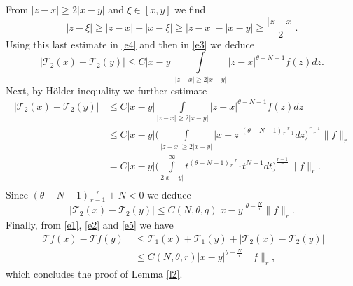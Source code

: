 \documentclass[leqno,12pt]{article}
\newcommand{\intl}{\int\limits}
\numberwithin{equation}{section}
\begin{document}
From $|z-x|\geq 2|x-y|$ and $\xi \in [x,y]$ we find
$$
|z-\xi|\geq |z-x|-|x-\xi|\geq |z-x|-|x-y| \geq \frac{|z-x|}{2}.
$$
Using this last estimate in \eqref{e4} and then in \eqref{e3} we deduce
$$
|\mathcal{T}_2(x)-\mathcal{T}_2(y)|\leq C |x-y| \intl_{|z-x|\geq 2|x-y|} \big|z-x\big|^{\theta-N-1}f(z) dz.
$$
Next, by H\"older inequality we further estimate
$$
\begin{aligned}
|\mathcal{T}_2(x)-\mathcal{T}_2(y)|& \leq C |x-y| \intl_{|z-x|\geq 2|x-y|} \big|z-x\big|^{\theta-N-1}f(z) dz \\[0.1cm]
&\leq C|x-y|\biggl(\intl_{|z-x|\geq 2|x-y|}\big|x-z\big|^{(\theta-N-1)\frac{r}{r-1}} dz\biggl)^{\frac{r-1}{r}}  \|f\|_r\\
&= C|x-y|\biggl(\intl_{2|x-y|}^\infty t^{(\theta-N-1)\frac{r}{r-1}} t^{N-1} dt\biggl)^{\frac{r-1}{r}}  \|f\|_r.\\
\end{aligned}
$$
Since $(\theta-N-1)\frac{r}{r-1}+N <0$ we deduce
\begin{equation}\label{e5}
|\mathcal{T}_2(x)-\mathcal{T}_2(y)| \leq C(N,\theta, q) \big|x-y\big|^{\theta-\frac{N}{r}}\|f\|_r.
\end{equation}
Finally, from \eqref{e1}, \eqref{e2} and \eqref{e5} we have
$$
\begin{aligned}
|\mathcal{T}f(x)-\mathcal{T}f(y)|& \leq \mathcal{T}_1(x)+\mathcal{T}_1(y)+|\mathcal{T}_2(x)-\mathcal{T}_2(y)|\\
&\leq  C(N,\theta, r) \big|x-y\big|^{\theta-\frac{N}{r}}\|f\|_r,
\end{aligned}
$$
which concludes the proof of Lemma \ref{l2}.
\end{document}
